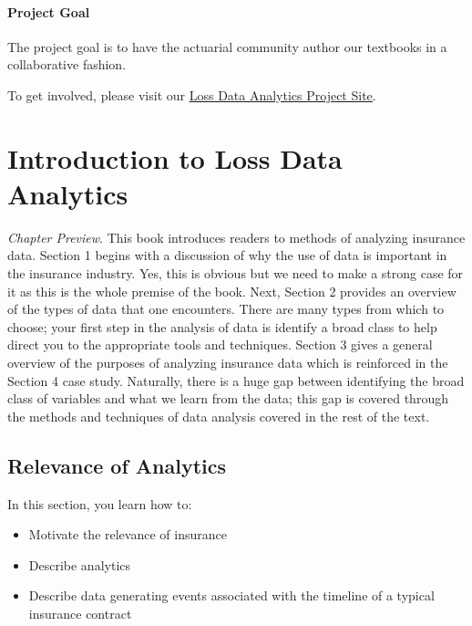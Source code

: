 \documentclass[]{book}
\providecommand{\tightlist}{%
  \setlength{\itemsep}{0pt}\setlength{\parskip}{0pt}}
\theoremstyle{definition}
\theoremstyle{definition}
\theoremstyle{definition}
\theoremstyle{remark}
\begin{document}
\subsubsection*{Project Goal}\label{project-goal}

The project goal is to have the actuarial community author our textbooks
in a collaborative fashion.

To get involved, please visit our
\href{https://sites.google.com/a/wisc.edu/loss-data-analytics/}{Loss
Data Analytics Project Site}.

\chapter{Introduction to Loss Data
Analytics}\label{introduction-to-loss-data-analytics}

\emph{Chapter Preview}. This book introduces readers to methods of
analyzing insurance data. Section 1 begins with a discussion of why the
use of data is important in the insurance industry. Yes, this is obvious
but we need to make a strong case for it as this is the whole premise of
the book. Next, Section 2 provides an overview of the types of data that
one encounters. There are many types from which to choose; your first
step in the analysis of data is identify a broad class to help direct
you to the appropriate tools and techniques. Section 3 gives a general
overview of the purposes of analyzing insurance data which is reinforced
in the Section 4 case study. Naturally, there is a huge gap between
identifying the broad class of variables and what we learn from the
data; this gap is covered through the methods and techniques of data
analysis covered in the rest of the text.

\section{Relevance of Analytics}\label{S:Intro}

In this section, you learn how to:

\begin{itemize}
\tightlist
\item
  Motivate the relevance of insurance
\item
  Describe analytics
\item
  Describe data generating events associated with the timeline of a
  typical insurance contract
\end{itemize}
\end{document}
